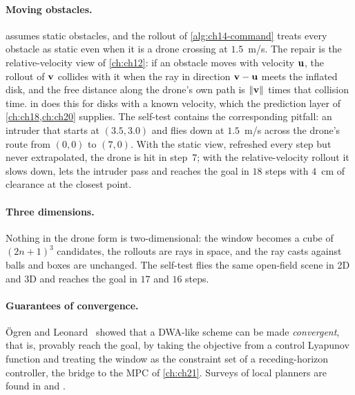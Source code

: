 \paragraph{Moving obstacles.}
 assumes static obstacles, and the rollout of
\cref{alg:ch14-command} treats every obstacle as static even when it is a
drone crossing at $1.5$~m/s. The repair is the relative-velocity view of
\cref{ch:ch12}: if an obstacle moves with velocity $\mathbf{u}$, the rollout
of $\mathbf{v}$ collides with it when the ray in direction $\mathbf{v} - \mathbf{u}$ meets
the inflated disk, and the free distance along the drone's own path is
$\left\lVert \mathbf{v} \right\rVert$ times that collision time.  in
 does this for disks with a known velocity, which the
prediction layer of \cref{ch:ch18,ch:ch20} supplies. The self-test contains
the corresponding pitfall: an intruder that starts at $(3.5, 3.0)$ and flies
down at $1.5$~m/s across the drone's route from $(0,0)$ to $(7, 0)$. With
the static view, refreshed every step but never extrapolated, the drone is
hit in step~7; with the relative-velocity rollout it slows down, lets the
intruder pass and reaches the goal in $18$ steps with $4$~cm of clearance
at the closest point.

\paragraph{Three dimensions.}
Nothing in the drone form is two-dimensional: the window becomes a cube of
$(2n+1)^3$ candidates, the rollouts are rays in space, and the ray casts
against balls and boxes are unchanged. The self-test flies the same open-field
scene in 2D and 3D and reaches the goal in $17$ and $16$ steps.

\paragraph{Guarantees of convergence.}
\"Ogren and Leonard~\cite{ogren2005convergent} showed that a DWA-like scheme
can be made \emph{convergent}, that is, provably reach the goal, by taking the
objective from a control Lyapunov function and treating the window as the
constraint set of a receding-horizon controller, the bridge to the MPC of
\cref{ch:ch21}. Surveys of local planners are found in
\cite{siciliano2016handbook} and \cite{choset2005principles}.


